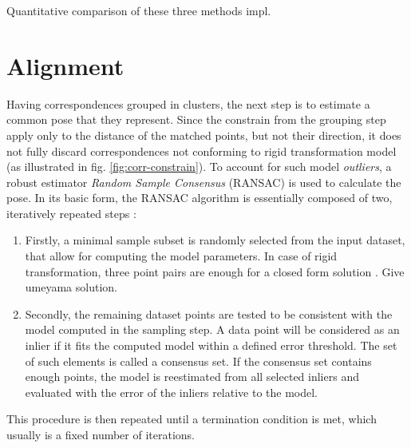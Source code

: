 Quantitative comparison of these three methods impl.


\section{Alignment}
\label{sec:alignment}
 
Having correspondences grouped in clusters, the next step is to estimate a common pose that they represent. Since the constrain from the grouping step apply only to the distance of the matched points, but not their direction, it does not fully discard correspondences not conforming to rigid transformation model (as illustrated in fig. \ref{fig:corr-constrain}). To account for such model \textit{outliers}, a robust estimator \textit{Random Sample Consensus} (RANSAC) \cite{ransacbase} is used to calculate the pose. In its basic form, the RANSAC algorithm is essentially composed of two, iteratively repeated steps \cite{wikipedia,ransacdummies}:
\begin{enumerate}
\item Firstly, a minimal sample subset is randomly selected from the input dataset, that allow for computing the model parameters. In case of rigid transformation, three point pairs are enough for a closed form solution \cite{umeyama}. Give umeyama solution.
\item Secondly, the remaining dataset points are tested to be consistent with the model computed in the sampling step. A data point will be considered as an inlier if it fits the computed model within a defined error threshold. The set of such elements is called a consensus set. If the consensus set contains enough points, the model is reestimated from all selected inliers and evaluated with the error of the inliers relative to the model.
\end{enumerate}
This procedure is then repeated until a termination condition is met, which usually is a fixed number of iterations.
